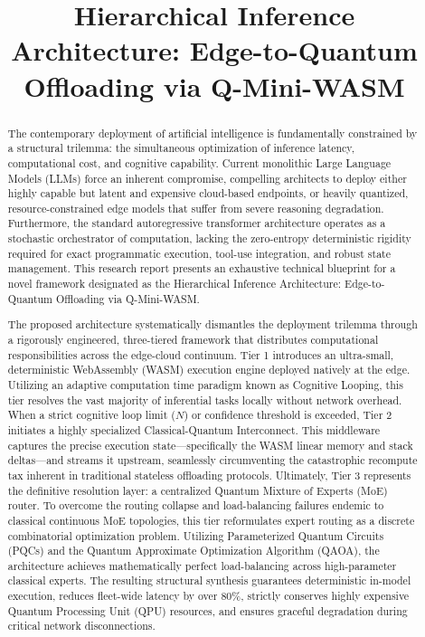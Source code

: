 \documentclass[11pt,a4paper]{article}
\title{Hierarchical Inference Architecture: Edge-to-Quantum Offloading via Q-Mini-WASM}
\author{}
\date{}
\begin{document}
\maketitle

\begin{abstract}
The contemporary deployment of artificial intelligence is fundamentally constrained by a structural trilemma: the simultaneous optimization of inference latency, computational cost, and cognitive capability. Current monolithic Large Language Models (LLMs) force an inherent compromise, compelling architects to deploy either highly capable but latent and expensive cloud-based endpoints, or heavily quantized, resource-constrained edge models that suffer from severe reasoning degradation. Furthermore, the standard autoregressive transformer architecture operates as a stochastic orchestrator of computation, lacking the zero-entropy deterministic rigidity required for exact programmatic execution, tool-use integration, and robust state management. This research report presents an exhaustive technical blueprint for a novel framework designated as the Hierarchical Inference Architecture: Edge-to-Quantum Offloading via Q-Mini-WASM.

The proposed architecture systematically dismantles the deployment trilemma through a rigorously engineered, three-tiered framework that distributes computational responsibilities across the edge-cloud continuum. Tier 1 introduces an ultra-small, deterministic WebAssembly (WASM) execution engine deployed natively at the edge. Utilizing an adaptive computation time paradigm known as Cognitive Looping, this tier resolves the vast majority of inferential tasks locally without network overhead. When a strict cognitive loop limit ($N$) or confidence threshold is exceeded, Tier 2 initiates a highly specialized Classical-Quantum Interconnect. This middleware captures the precise execution state---specifically the WASM linear memory and stack deltas---and streams it upstream, seamlessly circumventing the catastrophic recompute tax inherent in traditional stateless offloading protocols. Ultimately, Tier 3 represents the definitive resolution layer: a centralized Quantum Mixture of Experts (MoE) router. To overcome the routing collapse and load-balancing failures endemic to classical continuous MoE topologies, this tier reformulates expert routing as a discrete combinatorial optimization problem. Utilizing Parameterized Quantum Circuits (PQCs) and the Quantum Approximate Optimization Algorithm (QAOA), the architecture achieves mathematically perfect load-balancing across high-parameter classical experts. The resulting structural synthesis guarantees deterministic in-model execution, reduces fleet-wide latency by over 80\%, strictly conserves highly expensive Quantum Processing Unit (QPU) resources, and ensures graceful degradation during critical network disconnections.
\end{abstract}
\end{document}
